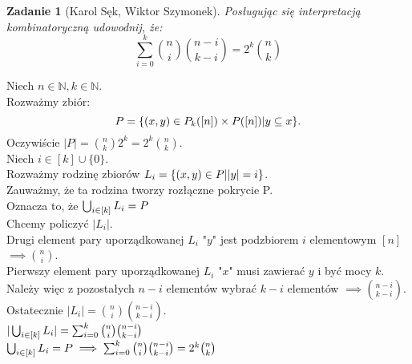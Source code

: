 \documentclass{mwart}
\newcommand{\N}{\mathbb{N}}
\newtheorem{zad}{Zadanie}[section]
\begin{document}
\begin{zad}[Karol Sęk, Wiktor Szymonek]
    Posługując się interpretacją kombinatoryczną udowodnij, że:
    \[ \sum_{i=0}^{k} \binom{n}{i} \binom{n-i}{k-i} = 2^k \binom{n}{k} \]
\end{zad}
\begin{mdframed}
    Niech $n \in \N , k \in \N$. \\
    Rozważmy zbiór:
    $$P=\{(x,y) \in P_k([n]) \times P([n]) \space|\space y \subseteq x \}.$$
    Oczywiście $|P| = \binom{n}{k}2^k =2^k\binom{n}{k}$. \\

    Niech $i \in [k] \cup \{0\}$.\\
    Rozważmy rodzinę zbiorów $L_i = \{(x,y) \in P \space| \space |y| = i\}$. \\
    Zauważmy, że ta rodzina tworzy rozłączne pokrycie P.\\
    Oznacza to, że $\bigcup_{\small i \in [k]} \space L_i = P$\\

    Chcemy policzyć $|L_i|$.\\
    Drugi element pary uporządkowanej $L_i$ "$y$" jest podzbiorem $i$ elementowym $[n]$ $\implies \binom{n}{i}$.\\
    Pierwszy element pary uporządkowanej $L_i$ "$x$" musi zawierać $y$ i być mocy $k$.\\
    Należy więc z pozostałych $n-i$ elementów wybrać $k-i$ elementów $\implies \binom{n-i}{k-i}$.\\

    Ostatecznie $|L_i| =  \binom{n}{i} \binom{n-i}{k-i}$.\\
    $|\bigcup_{\small i \in [k]} \space L_i | = \sum_{i=0}^{k}\binom{n}{i} \binom{n-i}{k-i}$\\
    $\bigcup_{\small i \in [k]} \space L_i = P \implies \sum_{i=0}^{k}\binom{n}{i} \binom{n-i}{k-i} = 2^k\binom{n}{k}$\\
\end{mdframed}
\end{document}
